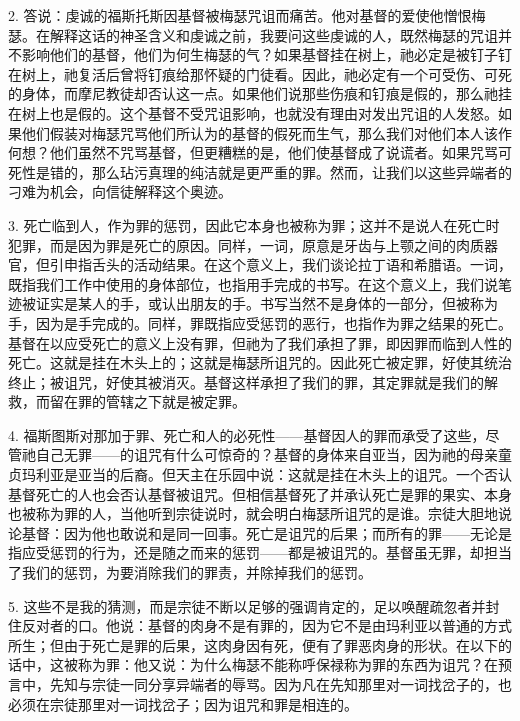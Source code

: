 2. 答说：虔诚的福斯托斯因基督被梅瑟咒诅而痛苦。他对基督的爱使他憎恨梅瑟。在解释这话的神圣含义和虔诚之前，我要问这些虔诚的人，既然梅瑟的咒诅并不影响他们的基督，他们为何生梅瑟的气？如果基督挂在树上，祂必定是被钉子钉在树上，祂复活后曾将钉痕给那怀疑的门徒看。因此，祂必定有一个可受伤、可死的身体，而摩尼教徒却否认这一点。如果他们说那些伤痕和钉痕是假的，那么祂挂在树上也是假的。这个基督不受咒诅影响，也就没有理由对发出咒诅的人发怒。如果他们假装对梅瑟咒骂他们所认为的基督的假死而生气，那么我们对他们本人该作何想？他们虽然不咒骂基督，但更糟糕的是，他们使基督成了说谎者。如果咒骂可死性是错的，那么玷污真理的纯洁就是更严重的罪。然而，让我们以这些异端者的刁难为机会，向信徒解释这个奥迹。\par

3. 死亡临到人，作为罪的惩罚，因此它本身也被称为罪；这并不是说人在死亡时犯罪，而是因为罪是死亡的原因。同样，一词，原意是牙齿与上颚之间的肉质器官，但引申指舌头的活动结果。在这个意义上，我们谈论拉丁语和希腊语。一词，既指我们工作中使用的身体部位，也指用手完成的书写。在这个意义上，我们说笔迹被证实是某人的手，或认出朋友的手。书写当然不是身体的一部分，但被称为手，因为是手完成的。同样，罪既指应受惩罚的恶行，也指作为罪之结果的死亡。基督在以应受死亡的意义上没有罪，但祂为了我们承担了罪，即因罪而临到人性的死亡。这就是挂在木头上的；这就是梅瑟所诅咒的。因此死亡被定罪，好使其统治终止；被诅咒，好使其被消灭。基督这样承担了我们的罪，其定罪就是我们的解救，而留在罪的管辖之下就是被定罪。\par

4. 福斯图斯对那加于罪、死亡和人的必死性——基督因人的罪而承受了这些，尽管祂自己无罪——的诅咒有什么可惊奇的？基督的身体来自亚当，因为祂的母亲童贞玛利亚是亚当的后裔。但天主在乐园中说：这就是挂在木头上的诅咒。一个否认基督死亡的人也会否认基督被诅咒。但相信基督死了并承认死亡是罪的果实、本身也被称为罪的人，当他听到宗徒说时，就会明白梅瑟所诅咒的是谁。宗徒大胆地说论基督：因为他也敢说和是同一回事。死亡是诅咒的后果；而所有的罪——无论是指应受惩罚的行为，还是随之而来的惩罚——都是被诅咒的。基督虽无罪，却担当了我们的惩罚，为要消除我们的罪责，并除掉我们的惩罚。\par

5. 这些不是我的猜测，而是宗徒不断以足够的强调肯定的，足以唤醒疏忽者并封住反对者的口。他说：基督的肉身不是有罪的，因为它不是由玛利亚以普通的方式所生；但由于死亡是罪的后果，这肉身因有死，便有了罪恶肉身的形状。在以下的话中，这被称为罪：他又说：为什么梅瑟不能称呼保禄称为罪的东西为诅咒？在预言中，先知与宗徒一同分享异端者的辱骂。因为凡在先知那里对一词找岔子的，也必须在宗徒那里对一词找岔子；因为诅咒和罪是相连的。\par

